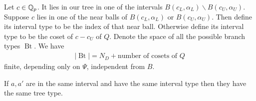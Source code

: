 \documentclass{amsart}
\DeclareMathOperator{\Bt}{Bt}
\begin{document}
\begin{Definition}
	Let $c \in \mathbb{Q}_p$.
	It lies in our tree in one of the intervals $B(c_L, \alpha_L) \backslash B(c_U, \alpha_U)$.
	Suppose $c$ lies in one of the near balls of $B(c_L, \alpha_L)$ or $B(c_U, \alpha_U)$.
	Then define its interval type to be the index of that near ball.
	Otherwise define its interval type to be the coset of $c - c_U$ of $Q$.
	Denote the space of all the possible branch types $\Bt$.
	We have
	\begin{align*}
		|\Bt| = N_D + \text {number of cosets of $Q$}
	\end{align*}
	finite, depending only on $\Psi$, independent from $B$.
	
\end{Definition}

\begin{Lemma} \label{interval}
	If $a, a'$ are in the same interval and have the same interval type then they have the same tree type.
\end{Lemma}
\end{document}
